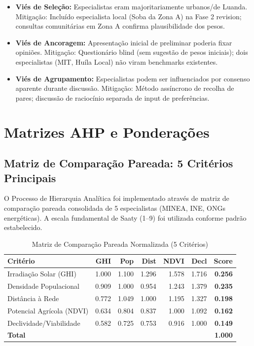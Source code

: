 \documentclass[12pt, a4paper]{article}
\begin{document}
\begin{itemize}
\item \textbf{Viés de Seleção:} Especialistas eram majoritariamente urbanos/de Luanda. Mitigação: Incluído especialista local (Soba da Zona A) na Fase 2 revision; consultas comunitárias em Zona A confirma plausibilidade dos pesos.

\item \textbf{Viés de Ancoragem:} Apresentação inicial de preliminar poderia fixar opiniões. Mitigação: Questionário blind (sem sugestão de pesos iniciais); dois especialistas (MIT, Huíla Local) não viram benchmarks existentes.

\item \textbf{Viés de Agrupamento:} Especialistas podem ser influenciados por consenso aparente durante discussão. Mitigação: Método assíncrono de recolha de pares; discussão de raciocínio separada de input de preferências.
\end{itemize}

\section{Matrizes AHP e Ponderações}
\label{app:ahp_matrix}

\subsection{Matriz de Comparação Pareada: 5 Critérios Principais}

O Processo de Hierarquia Analítica foi implementado através de matriz de comparação pareada consolidada de 5 especialistas (MINEA, INE, ONGs energéticas). A escala fundamental de Saaty (1–9) foi utilizada conforme padrão estabelecido.

\begin{table}[H]
\centering
\caption{Matriz de Comparação Pareada Normalizada (5 Critérios)}
\label{tab:ahp_matrix_detailed}
\footnotesize
\begin{tabular}{|l|r|r|r|r|r|r|}
\hline
\textbf{Critério} & \textbf{GHI} & \textbf{Pop} & \textbf{Dist} & \textbf{NDVI} & \textbf{Decl} & \textbf{Score} \\
\hline
Irradiação Solar (GHI) & 1.000 & 1.100 & 1.296 & 1.578 & 1.716 & \textbf{0.256} \\
Densidade Populacional & 0.909 & 1.000 & 0.954 & 1.243 & 1.379 & \textbf{0.235} \\
Distância à Rede & 0.772 & 1.049 & 1.000 & 1.195 & 1.327 & \textbf{0.198} \\
Potencial Agrícola (NDVI) & 0.634 & 0.804 & 0.837 & 1.000 & 1.092 & \textbf{0.162} \\
Declividade/Viabilidade & 0.582 & 0.725 & 0.753 & 0.916 & 1.000 & \textbf{0.149} \\
\hline
\textbf{Total} & & & & & & \textbf{1.000} \\
\hline
\end{tabular}
\end{table}
\end{document}
